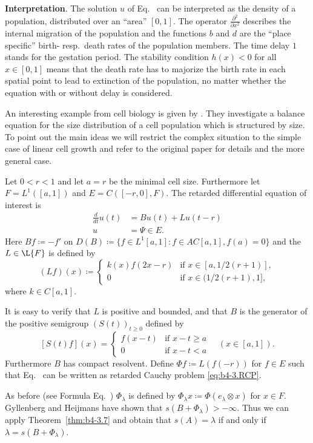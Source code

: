 \textbf{Interpretation}.\quad
	The solution $u$ of Eq.~ can be interpreted as the density of a population, distributed over an \enquote{area} $[0,1]$.
	The operator $\frac{\partial^2}{\partial x^2}$ describes the internal migration of the population and the functions $b$ and $d$ are the \enquote{place specific} birth- resp.\ death rates of the population members. 
	The time delay $1$ stands for the gestation period. 
	The stability condition $h(x) < 0$ for all $x \in [0,1]$ means that the death rate has to majorize the birth rate in each spatial point to lead to extinction of the population, no matter whether the equation with or without delay is considered.

\begin{example}\label{ex:b4-3.12}
	An interesting example from cell biology is given by \textcite{gyllenbergheijmans:1987}. 
	They investigate a balance equation for the size distribution of a cell population which is structured by size. 
	To point out the main ideas we will restrict the complex situation to the simple case of linear cell growth and refer to the original paper for details and the more general case.
	
    Let $0 < r < 1$ and let $a = r$ be the minimal cell size. 
    Furthermore let $F = L^1([a,1])$ and $E = C([-r,0],F)$. 
    The retarded differential equation of interest is 
    \begin{equation}\label{eq:b4-3.12}
            \begin{aligned}
        \frac{d}{dt}u(t) &= Bu(t) + Lu(t-r)\\
        u &= \Psi \in E.
        \end{aligned}
    \end{equation}
Here $Bf  \coloneq  -f'$ on $D(B) \coloneq \{f \in L^1[a,1] \colon f \in AC[a,1], f(a) = 0\}$ and the $L \in \L{F} $ is defined by
\[
(Lf)(x) \coloneq 
\begin{cases}
	k(x)f(2x-r) & \text{if } x \in [a,1/2(r+1)] , \\
	0 & \text{if } x \in (1/2(r+1),1] ,
\end{cases}
\]
where $k \in C[a,1]$.

It is easy to verify that $L$ is positive and bounded, and that $B$ is the generator of the positive semigroup $(S(t))_{t\geq0}$ defined by
\[
[S(t)f](x) = 
\begin{cases}
	f(x-t) & \text{if } x-t \geq a \\
	0 & \text{if } x-t < a
\end{cases}
\quad (x \in [a,1]).
\]
Furthermore $B$ has compact resolvent. 
Define $\Phi f  \coloneq  L(f(-r))$ for $f \in E$ such that Eq.~ can be written as retarded Cauchy problem \eqref{eq:b4-3.RCP}.

As before (see Formula Eq.~) $\Phi_{\lambda}$ is defined by $\Phi_{\lambda}x  \coloneq  \Phi(e_{\lambda}\otimes x)$ for $x \in F$. 
Gyllenberg and Heijmans have shown that $s(B + \Phi_{\lambda}) > -\infty$. 
Thus we can apply Theorem~\ref{thm:b4-3.7} and obtain that $s(A) = \lambda$ if and only if\/ $\lambda = s(B + \Phi_{\lambda})$.
\end{example}
